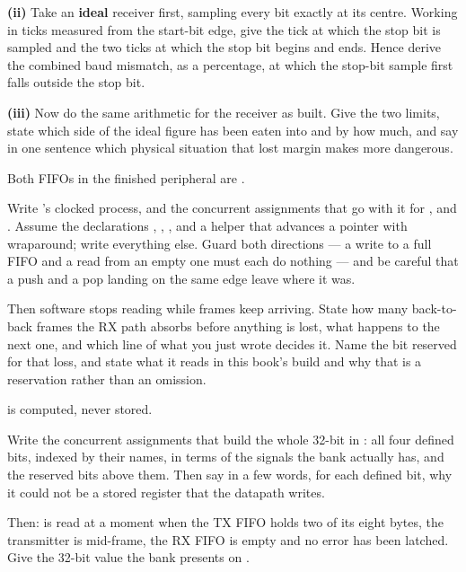 \medskip\noindent\textbf{(ii)} Take an \textbf{ideal} receiver first, sampling every bit exactly at
its centre. Working in ticks measured from the start-bit edge, give the tick at which the stop bit
is sampled and the two ticks at which the stop bit begins and ends. Hence derive the combined baud
mismatch, as a percentage, at which the stop-bit sample first falls outside the stop bit.

\medskip\noindent\textbf{(iii)} Now do the same arithmetic for the receiver as built. Give the two
limits, state which side of the ideal figure has been eaten into and by how much, and say in one
sentence which physical situation that lost margin makes more dangerous. 

 Both FIFOs in the finished peripheral are .

Write 's clocked process, and the concurrent assignments that go with it for
,  and . Assume the declarations , ,
,  and a helper that advances a pointer with wraparound; write everything
else. Guard both directions --- a write to a full FIFO and a read from an empty one must each do
nothing --- and be careful that a push and a pop landing on the same edge leave  where
it was.

Then software stops reading while frames keep arriving. State how many back-to-back frames the RX
path absorbs before anything is lost, what happens to the next one, and which line of what you just
wrote decides it. Name the  bit reserved for that loss, and state what it reads in
this book's build and why that is a reservation rather than an omission. 

\label{exa:q:4}

  is computed, never stored.

Write the concurrent assignments that build the whole 32-bit  in :
all four defined bits, indexed by their  names, in terms of the signals the bank
actually has, and the reserved bits above them. Then say in a few words, for each defined bit, why
it could not be a stored register that the datapath writes.

Then:  is read at a moment when the TX FIFO holds two of its eight bytes, the
transmitter is mid-frame, the RX FIFO is empty and no error has been latched. Give the 32-bit value
the bank presents on . 

